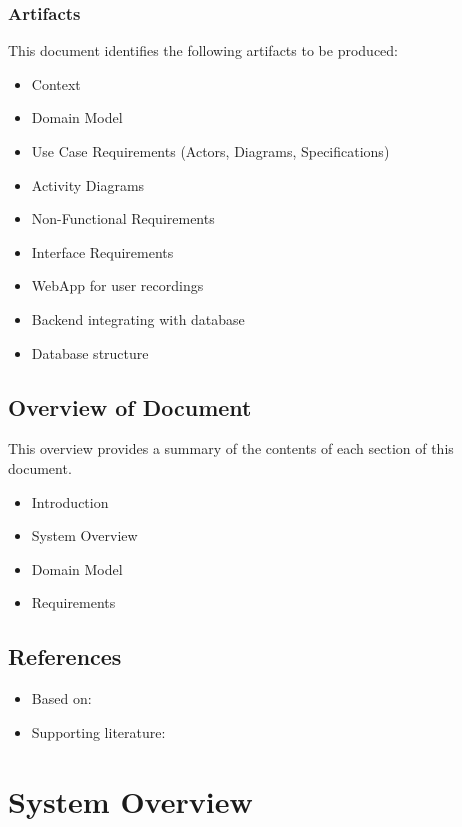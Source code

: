 \subsubsection{Artifacts}

This document identifies the following artifacts to be produced:

\begin{itemize}
    \item Context
    \item Domain Model
    \item Use Case Requirements (Actors, Diagrams, Specifications)
    \item Activity Diagrams
    \item Non-Functional Requirements
    \item Interface Requirements
    \item WebApp for user recordings
    \item Backend integrating with database
    \item Database structure
\end{itemize}

\subsection{Overview of Document}

This overview provides a summary of the contents of each section of this document.

\begin{itemize}
    \item Introduction
    \item System Overview
    \item Domain Model
    \item Requirements
\end{itemize}

\subsection{References}

\begin{itemize}
    \item Based on: \cite{naoufel2014requirements}
    \item Supporting literature: \cite{pressman2014software}
\end{itemize}

\section{System Overview}

